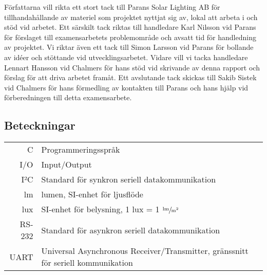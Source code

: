     Författarna vill rikta ett stort tack till Parans Solar Lighting AB för tillhandahållande av materiel som projektet nyttjat sig av, lokal att arbeta i och stöd vid arbetet. Ett särskilt tack riktas till handledare Karl Nilsson vid Parans för förslaget till examensarbetets problemområde och avsatt tid för handledning av projektet. Vi riktar även ett tack till Simon Larsson vid Parans för bollande av idéer och stöttande vid utvecklingsarbetet. Vidare vill vi tacka handledare Lennart Hansson vid Chalmers för hans stöd vid skrivande av denna rapport och förslag för att driva arbetet framåt. Ett avslutande tack skickas till Sakib Sistek vid Chalmers för hans förmedling av kontakten till Parans och hans hjälp vid förberedningen till detta examensarbete.


\newpage

\subsection*{Beteckningar} %
\label{sub:beteckningar}
    \begin{tabularx}{\textwidth}{@{}rX}
        C & Programmeringsspråk \\
        I/O & Input/Output \\
        I²C & Standard för synkron seriell datakommunikation \\
        lm & lumen, SI-enhet för ljusflöde \\
        lux & SI-enhet för belysning, 1 lux = 1 $\sfrac{\text{lm}}{\text{m}^2}$ \\
        RS-232 & Standard för asynkron seriell datakommunikation \\
        UART & Universal Asynchronous Receiver/Transmitter, gränssnitt för seriell kommunikation
        
    \end{tabularx}
